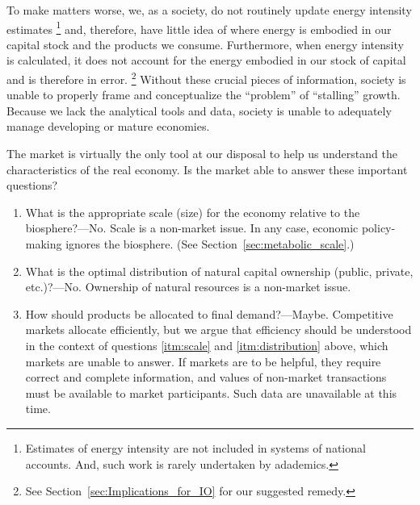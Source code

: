 To make matters worse, 
we, as a society, do not routinely update energy intensity estimates%
	\footnote{
	Estimates of energy intensity are not included in systems of national accounts.
	And, such work is rarely undertaken by adademics.\citep{Bullard1975, EIOLCA2014} 
	}
and, therefore, 
have little idea of where energy is embodied in 
our capital stock and the products we consume.
Furthermore, when energy intensity is calculated, 
it does not account for the energy embodied in our stock of capital
and is therefore in error.%
	\footnote{
	See Section~\ref{sec:Implications_for_IO} for our suggested remedy.
	}
Without these crucial pieces of information, 
society is unable to properly frame and conceptualize 
the ``problem'' of ``stalling'' growth. 
Because we lack the analytical tools and data,
society is unable to adequately manage developing or mature economies.

The market is virtually the only tool at our disposal 
to help us understand the characteristics of the real economy.
Is the market able to answer these important questions?

\begin{enumerate}
	\item{\label{itm:scale}What is the appropriate scale (size) for the economy relative 
			to the biosphere?---No. 
			Scale is a non-market issue. 
			In any case, economic policy-making ignores the biosphere.
			(See Section~\ref{sec:metabolic_scale}.)}
	\item{\label{itm:distribution}What is the optimal distribution 
			of natural capital ownership
			(public, private, etc.)?---No. 
			Ownership of natural resources is a non-market issue.}
	\item{\label{itm:allocation}How should products be allocated to final demand?---Maybe.
			Competitive markets allocate efficiently, but 
			we argue that efficiency should be understood in the context of questions
			\ref{itm:scale} and \ref{itm:distribution} above, 
			which markets are unable to answer. 
			If markets are to be helpful,
			they require correct and complete information, and
			values of non-market transactions must be available 
			to market participants. 
			Such data are unavailable at this time.}
\end{enumerate}


